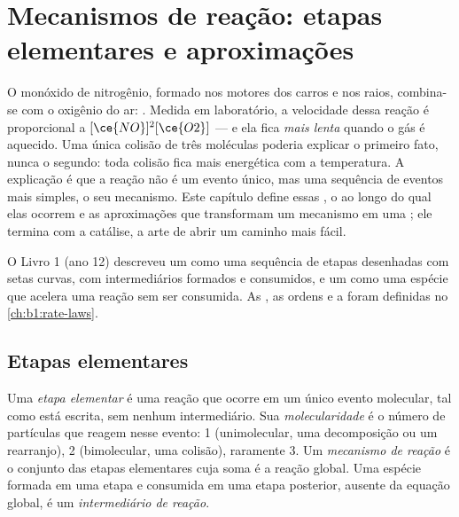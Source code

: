 \chapter{Mecanismos de reação: etapas elementares e aproximações}\label{ch:b1:elementary-steps}

O monóxido de nitrogênio, formado nos motores dos carros e nos raios,
combina-se com o oxigênio do ar: . Medida em
laboratório, a velocidade dessa reação é proporcional a
$[\ce{NO}]^2[\ce{O2}]$ --- e ela fica \emph{mais lenta} quando o gás é
aquecido. Uma única colisão de três moléculas poderia explicar o
primeiro fato, nunca o segundo: toda colisão fica mais energética com a
temperatura. A explicação é que a reação não é um evento único, mas uma
sequência de eventos mais simples, o seu mecanismo. Este capítulo define
essas , o  ao longo do qual elas
ocorrem e as aproximações que transformam um mecanismo em uma ; ele termina com a catálise, a arte de abrir um caminho mais
fácil.

\begin{recall}
O Livro 1 (ano 12) descreveu um  como uma sequência
de etapas desenhadas com setas curvas, com intermediários formados e
consumidos, e um  como uma espécie que acelera uma reação sem
ser consumida. As , as ordens e a 
foram definidas no \cref{ch:b1:rate-laws}.
\end{recall}

\section{Etapas elementares}

\begin{definition}\label{def:b1:elementary-steps:elementary-step}
Uma \emph{etapa elementar} é uma reação que ocorre
em um único evento molecular, tal como está escrita, sem nenhum
intermediário. Sua \emph{molecularidade} é o número
de partículas que reagem nesse evento: 1 (unimolecular, uma decomposição
ou um rearranjo), 2 (bimolecular, uma colisão), raramente 3. Um
\emph{mecanismo de reação} é o conjunto das etapas
elementares cuja soma é a reação global. Uma espécie formada em uma
etapa e consumida em uma etapa posterior, ausente da equação global, é
um \emph{intermediário de reação}.
\end{definition}

